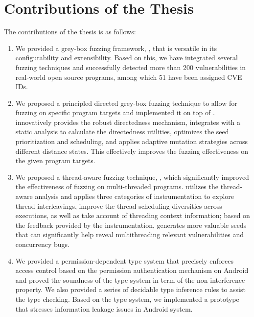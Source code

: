 \section{Contributions of the Thesis}
The contributions of the thesis is as follows:
\begin{enumerate}
	\item We provided a grey-box fuzzing framework, \FOT, that is versatile in its configurability and extensibility. Based on this, we have integrated several fuzzing techniques and successfully detected more than 200 vulnerabilities in real-world open source programs, among which 51 have been assigned CVE IDs.
	\item We proposed a principled directed grey-box fuzzing technique \dFOT to allow for fuzzing on specific program targets and implemented it on top of \FOT. \dFOT innovatively provides the robust directedness mechanism, integrates with a static analysis to calculate the directedness utilities, optimizes the seed prioritization and scheduling, and applies adaptive mutation strategies across different distance states. This effectively improves the fuzzing effectiveness on the given program targets.
	\item We proposed a thread-aware fuzzing technique, \mtfuzz, which significantly improved the effectiveness of fuzzing on multi-threaded programs. \mtfuzz utilizes the thread-aware analysis and applies three categories of instrumentation to explore thread-interleavings,  improve the thread-scheduling diversities across executions, as well as take account of threading context information; based on the feedback provided by the instrumentation, \mtfuzz generates more valuable seeds that can significantly help reveal multithreading relevant vulnerabilities and concurrency bugs.
	\item We provided a permission-dependent type system that precisely enforces access control based on the permission authentication mechanism on Android and proved the soundness of the type system in term of the non-interference property. We also provided a series of decidable type inference rules to assist the type checking. Based on the type system, we implemented a prototype that stresses information leakage issues in Android system.
\end{enumerate}


